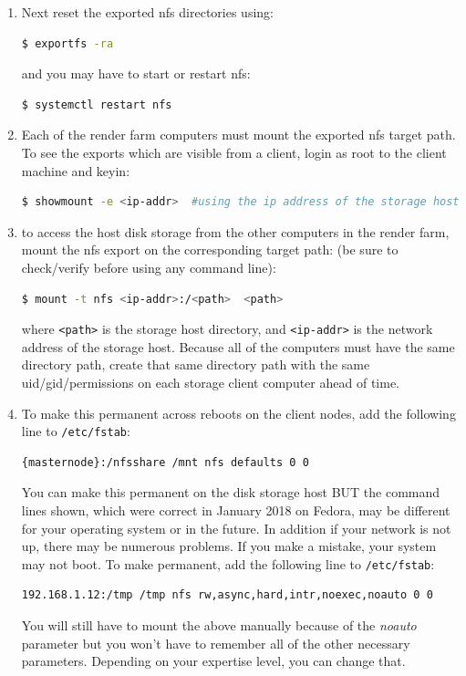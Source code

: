 \begin{description}
\begin{enumerate}
        \item Next reset the exported nfs directories using: 
        \begin{lstlisting}[language=bash]
$ exportfs -ra
        \end{lstlisting} 
        and you may have to start or restart nfs: 
        \begin{lstlisting}[language=bash]
$ systemctl restart nfs
        \end{lstlisting}
        \item Each of the render farm computers must mount the exported nfs target path.  To see the exports
        which are visible from a client, login as root to the client machine and keyin:
        \begin{lstlisting}[language=bash]
$ showmount -e <ip-addr>  #using the ip address of the storage host
        \end{lstlisting}
        \item to access the host disk storage from the other computers in the render farm, mount the nfs export on
        the corresponding target path: (be sure to check/verify before using any command line):
        \begin{lstlisting}[language=bash]
$ mount -t nfs <ip-addr>:/<path>  <path>
        \end{lstlisting}
        where \texttt{<path>} is the storage host directory, and \texttt{<ip-addr>} is the network address of the storage host.        
        Because all of the computers must have the same directory path, create that same directory path with the same uid/gid/permissions on each storage client computer ahead of time.
        \item To make this permanent across reboots on the client nodes, add the following line to \texttt{/etc/fstab}: 
        \begin{lstlisting}[language=bash]
{masternode}:/nfsshare /mnt nfs defaults 0 0
        \end{lstlisting}
        You can make this permanent on the disk storage host BUT the command lines shown, which were
        correct in January 2018 on Fedora, may be different for your operating system or in the future.  In
        addition if your network is not up, there may be numerous problems.  If you make a mistake, your
        system may not boot.  To make permanent, add the following line to \texttt{/etc/fstab}:
        \begin{lstlisting}[language=bash]
192.168.1.12:/tmp /tmp nfs rw,async,hard,intr,noexec,noauto 0 0
        \end{lstlisting}
        You will still have to mount the above manually because of the \textit{noauto} parameter but you won’t
        have to remember all of the other necessary parameters.  Depending on your expertise level, you can
        change that.
        

\end{enumerate}
\end{description}
